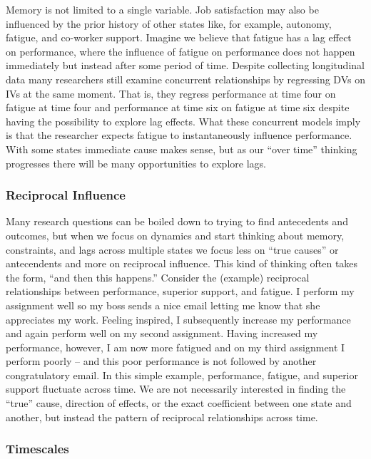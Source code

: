 \documentclass[english,,man]{apa6}
\theoremstyle{definition}
\theoremstyle{definition}
\theoremstyle{definition}
\theoremstyle{remark}
\begin{document}
Memory is not limited to a single variable. Job satisfaction may also be
influenced by the prior history of other states like, for example,
autonomy, fatigue, and co-worker support. Imagine we believe that
fatigue has a lag effect on performance, where the influence of fatigue
on performance does not happen immediately but instead after some period
of time. Despite collecting longitudinal data many researchers still
examine concurrent relationships by regressing DVs on IVs at the same
moment. That is, they regress performance at time four on fatigue at
time four and performance at time six on fatigue at time six despite
having the possibility to explore lag effects. What these concurrent
models imply is that the researcher expects fatigue to instantaneously
influence performance. With some states immediate cause makes sense, but
as our \enquote{over time} thinking progresses there will be many
opportunities to explore lags.

\hypertarget{reciprocal-influence}{%
\subsubsection{Reciprocal Influence}\label{reciprocal-influence}}

Many research questions can be boiled down to trying to find antecedents
and outcomes, but when we focus on dynamics and start thinking about
memory, constraints, and lags across multiple states we focus less on
\enquote{true causes} or antecendents and more on reciprocal influence.
This kind of thinking often takes the form, \enquote{and then this
happens.} Consider the (example) reciprocal relationships between
performance, superior support, and fatigue. I perform my assignment well
so my boss sends a nice email letting me know that she appreciates my
work. Feeling inspired, I subsequently increase my performance and again
perform well on my second assignment. Having increased my performance,
however, I am now more fatigued and on my third assignment I perform
poorly -- and this poor performance is not followed by another
congratulatory email. In this simple example, performance, fatigue, and
superior support fluctuate across time. We are not necessarily
interested in finding the \enquote{true} cause, direction of effects, or
the exact coefficient between one state and another, but instead the
pattern of reciprocal relationships across time.

\hypertarget{timescales}{%
\subsubsection{Timescales}\label{timescales}}
\end{document}
